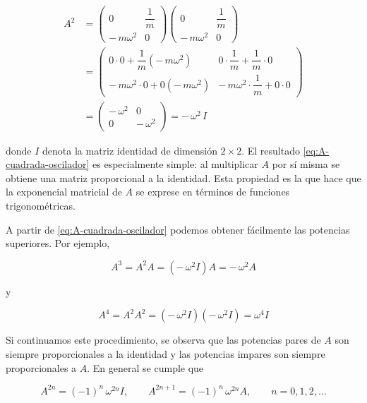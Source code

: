 \documentclass{article}
\begin{document}
\begin{equation}
\begin{split}
A^{2}
&=
\begin{pmatrix}
0 & \dfrac{1}{m} \\[6pt]
-\,m\omega^{2} & 0
\end{pmatrix}
\begin{pmatrix}
0 & \dfrac{1}{m} \\[6pt]
-\,m\omega^{2} & 0
\end{pmatrix} \\[8pt]
&=
\begin{pmatrix}
0\cdot 0 + \dfrac{1}{m}\left(-\,m\omega^{2}\right) &
0\cdot \dfrac{1}{m} + \dfrac{1}{m}\cdot 0 \\[6pt]
-\,m\omega^{2}\cdot 0 + 0\left(-\,m\omega^{2}\right) &
-\,m\omega^{2}\cdot \dfrac{1}{m} + 0\cdot 0
\end{pmatrix} \\[8pt]
&=
\begin{pmatrix}
-\,\omega^{2} & 0 \\[4pt]
0 & -\,\omega^{2}
\end{pmatrix}
= -\,\omega^{2}\,I
\end{split}
\label{eq:A-cuadrada-oscilador}
\end{equation}

donde $I$ denota la matriz identidad de dimensión $2\times 2$. El resultado
\eqref{eq:A-cuadrada-oscilador} es especialmente simple: al multiplicar $A$ por
sí misma se obtiene una matriz proporcional a la identidad. Esta propiedad es
la que hace que la exponencial matricial de $A$ se exprese en términos de
funciones trigonométricas.

A partir de \eqref{eq:A-cuadrada-oscilador} podemos obtener fácilmente las
potencias superiores. Por ejemplo,

\[
A^{3} = A^{2}A = \left(-\,\omega^{2}I\right)A = -\,\omega^{2}A
\]

y

\[
A^{4} = A^{2}A^{2} = \left(-\,\omega^{2}I\right)\left(-\,\omega^{2}I\right)
= \omega^{4}I
\]

Si continuamos este procedimiento, se observa que las potencias pares de $A$
son siempre proporcionales a la identidad y las potencias impares son siempre
proporcionales a $A$. En general se cumple que

\begin{equation}
A^{2n} = (-1)^{n}\,\omega^{2n} I,
\qquad
A^{2n+1} = (-1)^{n}\,\omega^{2n} A,
\qquad n=0,1,2,\dots
\label{eq:potencias-A-generales}
\end{equation}
\end{document}
